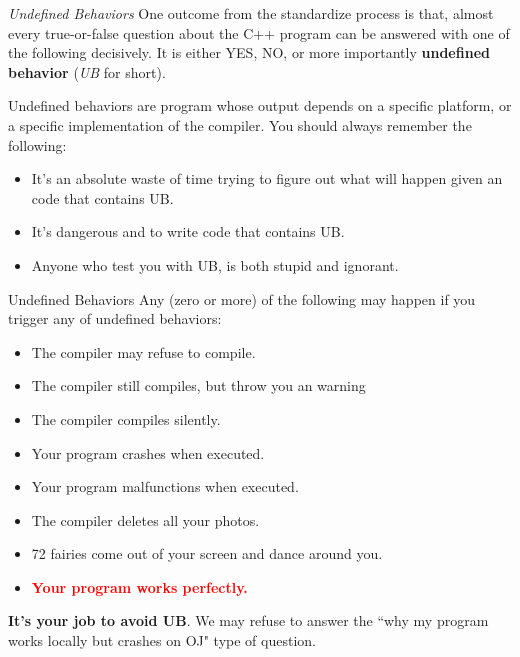 \begin{frame}{\textit{Undefined Behaviors}}
One outcome from the standardize process is that, almost every true-or-false question about the C++ program can be answered with one of the following decisively. It is either YES, NO, or more importantly \textbf{undefined behavior} (\textit{UB} for short).

Undefined behaviors are program whose output depends on a specific platform, or a specific implementation of the compiler. You should always remember the following:
\begin{itemize}
	\item It's an absolute waste of time trying to figure out what will happen given an code that contains UB.
	\item It's dangerous and to write code that contains UB.
	\item Anyone who test you with UB, is both stupid and ignorant.
\end{itemize}

\end{frame}

\begin{frame}{Undefined Behaviors}
Any (zero or more) of the following may happen if you trigger any of undefined behaviors:

\begin{itemize}
	\item The compiler may refuse to compile.
	\item The compiler still compiles, but throw you an warning
	\item The compiler compiles silently.
	\item Your program crashes when executed.
	\item Your program malfunctions when executed.
	\item The compiler deletes all your photos.
	\item 72 fairies come out of your screen and dance around you.
	\item \textbf{\textcolor{red}{Your program works perfectly.}}
\end{itemize} 

\textbf{It's your job to avoid UB}. We may refuse to answer the ``why my program works locally but crashes on OJ" type of question.
\end{frame}

